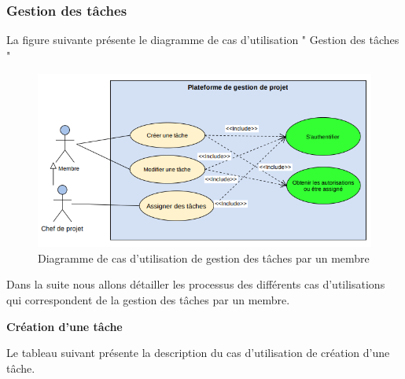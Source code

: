 \subsubsection{		Gestion des tâches}
\hspace{4mm}La figure suivante présente le diagramme de cas d'utilisation " Gestion des tâches "
\begin{figure}[h]
    \centering
    \includegraphics[scale=0.63]{figures/a3.png}
    \caption{Diagramme de cas d'utilisation de gestion des tâches par un membre }
    \label{fig:cas_gerer_tache}
\end{figure}
\par Dans la suite nous allons détailler les processus des différents cas d'utilisations qui correspondent de la gestion des tâches par un membre.
\newpage
\par \textbf{  	 	Création d’une tâche	}
\par Le tableau suivant présente la description du cas d'utilisation de création d'une tâche.

